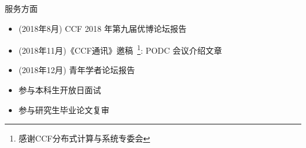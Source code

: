 \begin{frame}{服务方面}
  \setcounter{footnote}{0} 
  \begin{itemize}
    \setlength{\itemsep}{10pt}
    \item (2018年8月) CCF 2018 年第九届优博论坛报告
    \item (2018年11月)《CCF通讯》邀稿~\footnote{感谢CCF分布式计算与系统专委会}: PODC 会议介绍文章
    \item (2018年12月) 青年学者论坛报告
    \item 参与本科生开放日面试
    \item 参与研究生毕业论文复审
  \end{itemize}
\end{frame}
